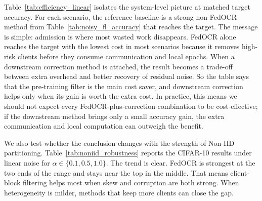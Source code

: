 ﻿\documentclass[conference]{IEEEtran}
\theoremstyle{definition}
\theoremstyle{remark}
\begin{document}
Table~\ref{tab:efficiency_linear} isolates the system-level picture at matched target accuracy.
For each scenario, the reference baseline is a strong non-FedOCR method from Table~\ref{tab:noisy_fl_accuracy} that reaches the target.
The message is simple: admission is where most wasted work disappears.
FedOCR alone reaches the target with the lowest cost in most scenarios because it removes high-risk clients before they consume communication and local epochs.
When a downstream correction method is attached, the result becomes a trade-off between extra overhead and better recovery of residual noise.
So the table says that the pre-training filter is the main cost saver, and downstream correction helps only when its gain is worth the extra cost.
In practice, this means we should not expect every FedOCR-plus-correction combination to be cost-effective; if the downstream method brings only a small accuracy gain, the extra communication and local computation can outweigh the benefit.

We also test whether the conclusion changes with the strength of Non-IID partitioning.
Table~\ref{tab:noniid_robustness} reports the CIFAR-10 results under linear noise for $\alpha\in\{0.1,0.5,1.0\}$.
The trend is clear. FedOCR is strongest at the two ends of the range and stays near the top in the middle.
That means client-block filtering helps most when skew and corruption are both strong.
When heterogeneity is milder, methods that keep more clients can close the gap.
\end{document}
